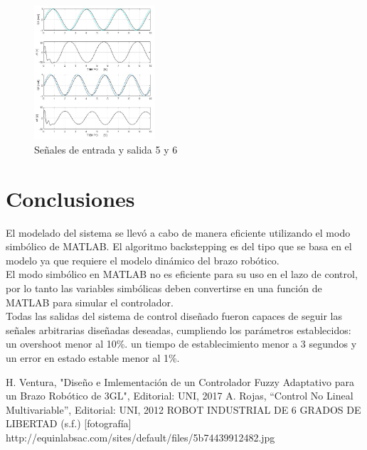 \documentclass[conference]{IEEEtran}
\begin{document}
\begin{figure} [h]
\centering
\includegraphics[width=0.4\textwidth]{images/seguimiento/q5_q6_seg.jpg}
\caption{Señales de entrada y salida 5 y 6}
\end{figure}


\newpage
\section{Conclusiones}
El modelado del sistema se llevó a cabo de manera eficiente utilizando el modo simbólico de MATLAB. El algoritmo backstepping es del tipo que se basa en el modelo ya que requiere el modelo dinámico del brazo robótico.  \\
El modo simbólico en MATLAB no es eficiente para su uso en el lazo de control, por lo tanto las variables simbólicas deben convertirse en una función de MATLAB para simular el controlador.\\
Todas las salidas del sistema de control diseñado fueron capaces de seguir las señales arbitrarias diseñadas deseadas, cumpliendo los parámetros establecidos: un overshoot menor al 10\%. un tiempo de establecimiento menor a 3 segundos y un error en estado estable menor al 1\%.

\begin{thebibliography}{00}
 H. Ventura, "Diseño e Imlementación de un Controlador Fuzzy Adaptativo para un Brazo Robótico de 3GL", Editorial: UNI, 2017
 A. Rojas, “Control No Lineal Multivariable”, Editorial: UNI, 2012
 ROBOT INDUSTRIAL DE 6 GRADOS DE LIBERTAD  (s.f.) [fotografía] http://equinlabsac.com/sites/default/files/5b74439912482.jpg
\end{thebibliography}
\vspace{12pt}
\end{document}
